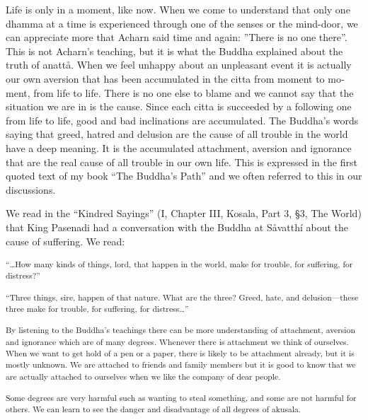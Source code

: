 \textdutch{Life is only in a moment, like now. When we come to
understand that only one dhamma at a time is experienced through one of
the senses or the mind-door, we can appreciate more that Acharn said
time and again: ''There is no one there''. This is not Acharn's
teaching, but it is what the Buddha explained about the truth of anattå.
When we feel unhappy about an unpleasant event it is actually our own
aversion that has been accumulated in the citta from moment to moment,
from life to life. There is no one else to blame and we cannot say that
the situation we are in is the cause. Since each citta is succeeded by a
following one from life to life, good and bad inclinations are
accumulated. The Buddha's words saying that greed, hatred and delusion
are the cause of all trouble in the world have a deep meaning. It is the
accumulated attachment, aversion and ignorance that are the real cause
of all trouble in our own life. This is expressed in the first quoted
text of my book ``The Buddha's Path'' and we often referred to this in
our discussions. }

\textdutch{We read in the ``}\textenglish[variant=american]{Kindred
Sayings}\textdutch{''} \textdutch{(I, Chapter III, Kosala, Part 3,
}§\textenglish[variant=american]{3, The World) that King Pasenadi had a
conversation with the Buddha at S}\textdanish{å}vatthí
\textenglish[variant=american]{about the cause of suffering. We read:}

\textsuperscript{``\ldots{}\textenglish[variant=american]{How many kinds
of things, lord, that happen in the world, make for trouble, for
suffering, for distress?}''}

\textsuperscript{``\textenglish[variant=american]{Three things, sire,
happen of that nature. What are the three? Greed, hate, and
delusion---these three make for trouble, for suffering, for
distress}\ldots{}''}

\textsuperscript{\textdutch{{By listening to the Buddha's teachings
there can be more understanding of attachment, aversion and ignorance
which are of many degrees. Whenever there is attachment we think of
ourselves. When we want to get hold of a pen or a paper, there is likely
to be attachment already, but it is mostly unknown. We are attached to
friends and family members but it is good to know that we are actually
attached to ourselves when we like the company of dear people.}}}

\textsuperscript{\textdutch{{Some degrees are very harmful such as
wanting to steal something, and some are not harmful for others. We can
learn to see the danger and disadvantage of all degrees of akusala. }}}

